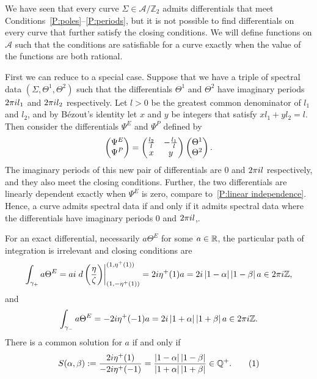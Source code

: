 \documentclass{article}
\begin{document}
We have seen that every curve $\Sigma\in\mathcal{A}/\mathbb{Z}_2$ admits differentials that meet Conditions~\ref{P:poles}--\ref{P:periods}, but it is not possible to find differentials on every curve that further satisfy the closing conditions. We will define functions on $\mathcal{A}$ such that the conditions are satisfiable for a curve exactly when the value of the functions are both rational.

First we can reduce to a special case. Suppose that we have a triple of spectral data $(\Sigma,\Theta^1,\Theta^2)$ such that the differentials $\Theta^1$ and $\Theta^2$ have imaginary periods $2\pi i l_1$ and $2\pi i l_2$ respectively. Let $l>0$ be the greatest common denominator of $l_1$ and $l_2$, and by B\'ezout's identity let $x$ and $y$ be integers that satisfy $xl_1 + yl_2 = l$. Then consider the differentials $\Psi^E$ and $\Psi^P$ defined by
\[
\begin{pmatrix} \Psi^E \\ \Psi^P \end{pmatrix} =
\begin{pmatrix}
\tfrac{l_2}{l}    &   -\tfrac{l_1}{l} \\
x                       &   y
\end{pmatrix}
\begin{pmatrix} \Theta^1 \\ \Theta^2 \end{pmatrix}.
\]
The imaginary periods of this new pair of differentials are $0$ and $2\pi i l$ respectively, and they also meet the closing conditions. Further, the two differentials are linearly dependent exactly when $\Psi^E$ is zero, compare to~\ref{P:linear independence}. Hence, a curve admits spectral data if and only if it admits spectral data where the differentials have imaginary periods $0$ and $2\pi i l$,.

For an exact differential, necessarily $a\Theta^E$ for some $a\in\mathbb{R}$, the particular path of integration is irrelevant and closing conditions are
\[
\int_{\gamma_{+}} a\Theta^E = ai \left. d\left(\frac{\eta}{\zeta}\right) \right|_{(1, -\eta^+(1))}^{(1, \eta^+(1))} = 2i \eta^+(1)a = 2i \left|1-\alpha\right|\left|1-\beta\right|a \in 2\pi i \mathbb{Z},
\]
and 
\[
\int_{\gamma_{-}} a\Theta^E = -2i \eta^+(-1)a = 2i \left|1+\alpha\right|\left|1+\beta\right|a \in 2\pi i \mathbb{Z}.
\]
There is a common solution for $a$ if and only if
\[
S(\alpha,\beta) := \frac{2\iu \eta^+(1)}{-2\iu \eta^+(-1)} = \frac{\abs{1-\alpha}\abs{1-\beta}}{\abs{1+\alpha}\abs{1+\beta}} \in \Q^+.
\labelthis{eqn:def_S}
\]
\end{document}
